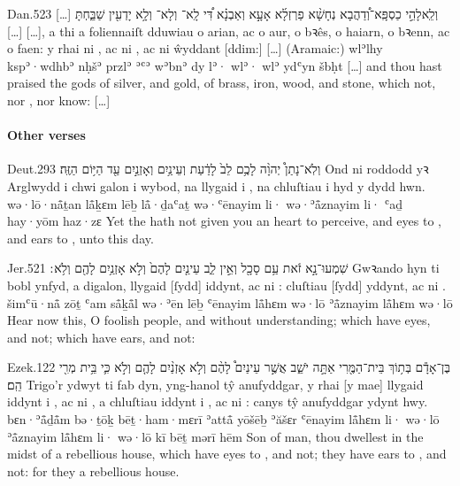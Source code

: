 \begin{example}{Dan.}{5}{23}{}{}
	\quoling
	{[…] וְלֵֽאלָהֵ֣י כַסְפָּֽא־וְ֠דַהֲבָא נְחָשָׁ֨א פַרְזְלָ֜א אָעָ֣א וְאַבְנָ֗א דִּ֠י לָֽא־ וְלָא־ וְלָ֥א יָדְעִ֖ין שַׁבַּ֑חְתָּ […]}
	{[…], a thi a foliennaiſt dduwiau o arian, ac o aur, o bꝛês, o haiarn, o bꝛenn, ac o faen: y rhai ni , ac ni , ac ni ŵyddant [ddim:] […]}
	{(Aramaic:) wlʾlhy kspʾ·wdhbʾ nḥšʾ przlʾ ʾʿʾ wʾbnʾ dy lʾ· wlʾ· wlʾ ydʿyn šbḥt}
	{[…] and thou hast praised the gods of silver, and gold, of brass, iron, wood, and stone, which  not, nor , nor know: […]}
\end{example}



\paragraph{Other verses}

\begin{example}{Deut.}{29}{3}{}{}
	\quoling
	{וְלֹֽא־נָתַן֩ יְהוָ֨ה לָכֶ֥ם לֵב֙ לָדַ֔עַת וְעֵינַ֥יִם  וְאָזְנַ֣יִם  עַ֖ד הַיּ֥וֹם הַזֶּֽה׃}
	{Ond ni roddodd yꝛ Arglwydd i chwi galon i wybod, na llygaid i , na chluſtiau i  hyd y dydd hwn.}
	{wə·lō·nå̄ṯan {\YHWH} lå̄ḵɛm lēḇ lå̄·ḏaʿaṯ wə·ʿēnayim li· wə·ʾå̄znayim li· ʿaḏ hay·yōm haz·zɛ}
	{Yet the {\LORD} hath not given you an heart to perceive, and eyes to , and ears to , unto this day.}
\end{example}

\begin{example}{Jer.}{5}{21}{}{}
	\quoling
	{שִׁמְעוּ־נָ֣א זֹ֔את עַ֥ם סָכָ֖ל וְאֵ֣ין לֵ֑ב עֵינַ֤יִם לָהֶם֙ וְלֹ֣א  אָזְנַ֥יִם לָהֶ֖ם וְלֹ֥א ׃}
	{Gwꝛando hyn ti bobl ynfyd, a digalon, llygaid [ſydd] iddynt, ac ni : cluſtiau [ſydd] yddynt, ac ni .}
	{šimʿū·nå̄ zōṯ ʿam så̄ḵå̄l wə·ʾēn lēḇ ʿēnayim lå̄hɛm wə·lō  ʾå̄znayim lå̄hɛm wə·lō }
	{Hear now this, O foolish people, and without understanding; which have eyes, and  not; which have ears, and  not:}
\end{example}

\begin{example}{Ezek.}{12}{2}{}{}
	\quoling
	{בֶּן־אָדָ֕ם בְּת֥וֹךְ בֵּית־הַמֶּ֖רִי אַתָּ֣ה יֹשֵׁ֑ב אֲשֶׁ֣ר עֵינַיִם֩ לָהֶ֨ם  וְלֹ֣א  אָזְנַ֨יִם לָהֶ֤ם  וְלֹ֣א  כִּ֛י בֵּ֥ית מְרִ֖י הֵֽם׃}
	{Trigo’r ydwyt ti fab dyn, yng-hanol tŷ anufyddgar, y rhai [y mae] llygaid iddynt i , ac ni , a chluſtiau iddynt i , ac ni : canys tŷ anufyddgar ydynt hwy.}
	{bɛn·ʾå̄ḏå̄m bə·ṯōḵ bēṯ·ham·mɛrī ʾattå̄ yōšēḇ ʾăšɛr ʿēnayim lå̄hɛm li· wə·lō  ʾå̄znayim lå̄hɛm li· wə·lō  kī bēṯ mərī hēm}
	{Son of man, thou dwellest in the midst of a rebellious house, which have eyes to , and  not; they have ears to , and  not: for they  a rebellious house.}
\end{example}


